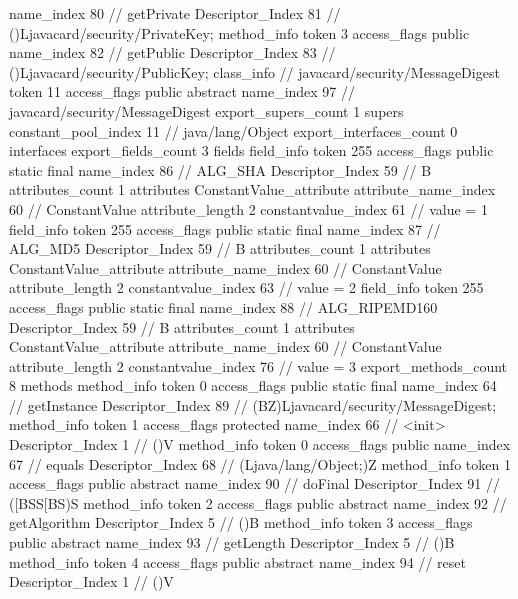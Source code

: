 {{{{{					name_index	80		// getPrivate
					Descriptor_Index	81		// ()Ljavacard/security/PrivateKey;
				}
				method_info {
					token	3
					access_flags	public
					name_index	82		// getPublic
					Descriptor_Index	83		// ()Ljavacard/security/PublicKey;
				}
			}
		}
		class_info {		// javacard/security/MessageDigest
			token	11
			access_flags	public abstract
			name_index	97		// javacard/security/MessageDigest
			export_supers_count	1
			supers {
				constant_pool_index	11		// java/lang/Object
			}
			export_interfaces_count	0
			interfaces {
			}
			export_fields_count	3
			fields {
			field_info {
				token	255
				access_flags	public static final
				name_index	86		// ALG_SHA
				Descriptor_Index	59		// B
				attributes_count	1
				attributes {
				ConstantValue_attribute {
					attribute_name_index	60		// ConstantValue
					attribute_length	2
					constantvalue_index	61		// value = 1
				}
				}
			}
			field_info {
				token	255
				access_flags	public static final
				name_index	87		// ALG_MD5
				Descriptor_Index	59		// B
				attributes_count	1
				attributes {
				ConstantValue_attribute {
					attribute_name_index	60		// ConstantValue
					attribute_length	2
					constantvalue_index	63		// value = 2
				}
				}
			}
			field_info {
				token	255
				access_flags	public static final
				name_index	88		// ALG_RIPEMD160
				Descriptor_Index	59		// B
				attributes_count	1
				attributes {
				ConstantValue_attribute {
					attribute_name_index	60		// ConstantValue
					attribute_length	2
					constantvalue_index	76		// value = 3
				}
				}
			}
			}
			export_methods_count	8
			methods {
				method_info {
					token	0
					access_flags	public static final
					name_index	64		// getInstance
					Descriptor_Index	89		// (BZ)Ljavacard/security/MessageDigest;
				}
				method_info {
					token	1
					access_flags	protected
					name_index	66		// <init>
					Descriptor_Index	1		// ()V
				}
				method_info {
					token	0
					access_flags	public
					name_index	67		// equals
					Descriptor_Index	68		// (Ljava/lang/Object;)Z
				}
				method_info {
					token	1
					access_flags	public abstract
					name_index	90		// doFinal
					Descriptor_Index	91		// ([BSS[BS)S
				}
				method_info {
					token	2
					access_flags	public abstract
					name_index	92		// getAlgorithm
					Descriptor_Index	5		// ()B
				}
				method_info {
					token	3
					access_flags	public abstract
					name_index	93		// getLength
					Descriptor_Index	5		// ()B
				}
				method_info {
					token	4
					access_flags	public abstract
					name_index	94		// reset
					Descriptor_Index	1		// ()V
}}}}}
